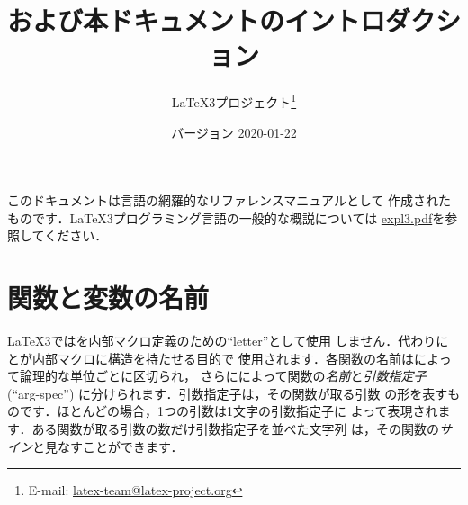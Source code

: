 \documentclass[uplatex,dvipdfmx,full,kernel]{wtpl3doc}
\begin{document}
\title{および本ドキュメントのイントロダクション}
\author{%
 \LaTeX3プロジェクト\thanks
   {%
     E-mail:
       \href{mailto:latex-team@latex-project.org}
         {latex-team@latex-project.org}%
   }%
}
\date{バージョン 2020-01-22}

\maketitle

このドキュメントは言語の網羅的なリファレンスマニュアルとして
作成されたものです．\LaTeX3プログラミング言語の一般的な概説については
\href{expl3.pdf}{expl3.pdf}を参照してください．

\section{関数と変数の名前}

\LaTeX3ではを内部マクロ定義のための\enquote{letter}として使用
しません．代わりに\code{_}と\code{:}が内部マクロに構造を持たせる目的で
使用されます．各関数の名前は\code{_}によって論理的な単位ごとに区切られ，
さらに\code{:}によって関数の\emph{名前}と\emph{引数指定子}
(\enquote{arg-spec}) に分けられます．引数指定子は，その関数が取る引数
の形を表すものです．ほとんどの場合，1つの引数は1文字の引数指定子に
よって表現されます．ある関数が取る引数の数だけ引数指定子を並べた文字列
は，その関数の\emph{サイン}と見なすことができます．
\end{document}
